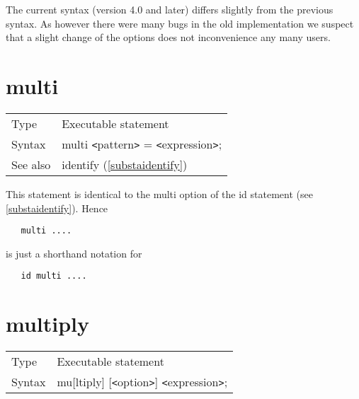 The current syntax (version 4.0 and later) differs slightly from the 
previous syntax. As however there were many bugs in the old implementation 
we suspect that a slight change of the options does not inconvenience any 
many users.

 
\section{multi}
\label{substamulti}

\noindent \begin{tabular}{ll}
Type & Executable statement\\
Syntax & multi {\tt<}pattern{\tt>} = {\tt<}expression{\tt>};
\\ See also & identify (\ref{substaidentify})
\end{tabular} \vspace{4mm}

\noindent This statement is identical to the multi option of 
the id statement (see \ref{substaidentify}). Hence
\begin{verbatim}
   multi ....
\end{verbatim}
is just a shorthand notation for
\begin{verbatim}
   id multi ....
\end{verbatim}
\vspace{10mm}

% 
%
%
%
 
\section{multiply}
\label{substamultiply}

\noindent \begin{tabular}{ll}
Type & Executable statement\\
Syntax & mu[ltiply] [{\tt<}option{\tt>}] {\tt<}expression{\tt>};
\end{tabular} \vspace{4mm}

